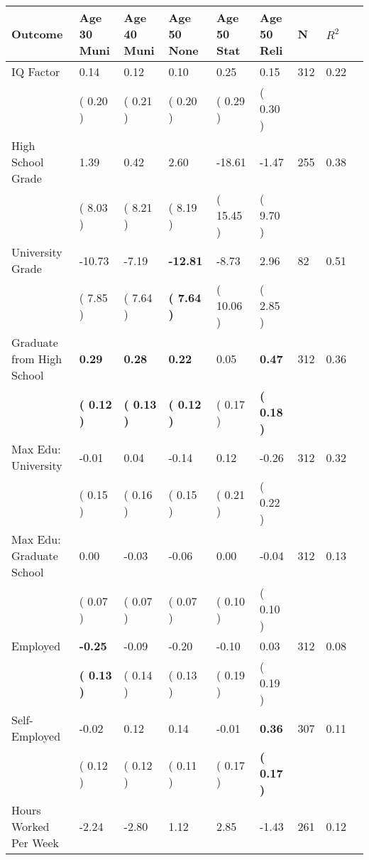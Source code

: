 \begin{tabular}{L{6.2cm} C{1.8cm} C{1.8cm} C{1.8cm} C{1.8cm} C{1.8cm} C{1.8cm} C{0.3cm} C{0.3cm}}
\toprule
 \textbf{Outcome} & \textbf{Age 30 Muni} & \textbf{Age 40 Muni} & \textbf{Age 50 None} & \textbf{Age 50 Stat} & \textbf{Age 50 Reli} & \textbf{N} & \textbf{$ R^2$} \\
\midrule
IQ Factor &      0.14 &      0.12 &      0.10 &      0.25 &      0.15  & 312 &       0.22 \\ 
 & (     0.20 ) & (     0.21 ) & (     0.20 ) & (     0.29 ) & (     0.30 )  & \\
High School Grade &      1.39 &      0.42 &      2.60 &    -18.61 &     -1.47  & 255 &       0.38 \\ 
 & (     8.03 ) & (     8.21 ) & (     8.19 ) & (    15.45 ) & (     9.70 )  & \\
University Grade &    -10.73 &     -7.19 & \textbf{   -12.81} &     -8.73 &      2.96  & 82 &       0.51 \\ 
 & (     7.85 ) & (     7.64 ) & \textbf{(     7.64 )} & (    10.06 ) & (     2.85 )  & \\
Graduate from High School & \textbf{     0.29} & \textbf{     0.28} & \textbf{     0.22} &      0.05 & \textbf{     0.47}  & 312 &       0.36 \\ 
 & \textbf{(     0.12 )} & \textbf{(     0.13 )} & \textbf{(     0.12 )} & (     0.17 ) & \textbf{(     0.18 )}  & \\
Max Edu: University &     -0.01 &      0.04 &     -0.14 &      0.12 &     -0.26  & 312 &       0.32 \\ 
 & (     0.15 ) & (     0.16 ) & (     0.15 ) & (     0.21 ) & (     0.22 )  & \\
Max Edu: Graduate School &      0.00 &     -0.03 &     -0.06 &      0.00 &     -0.04  & 312 &       0.13 \\ 
 & (     0.07 ) & (     0.07 ) & (     0.07 ) & (     0.10 ) & (     0.10 )  & \\
Employed & \textbf{    -0.25} &     -0.09 &     -0.20 &     -0.10 &      0.03  & 312 &       0.08 \\ 
 & \textbf{(     0.13 )} & (     0.14 ) & (     0.13 ) & (     0.19 ) & (     0.19 )  & \\
Self-Employed &     -0.02 &      0.12 &      0.14 &     -0.01 & \textbf{     0.36}  & 307 &       0.11 \\ 
 & (     0.12 ) & (     0.12 ) & (     0.11 ) & (     0.17 ) & \textbf{(     0.17 )}  & \\
Hours Worked Per Week &     -2.24 &     -2.80 &      1.12 &      2.85 &     -1.43  & 261 &       0.12 \\ 

\end{tabular}
